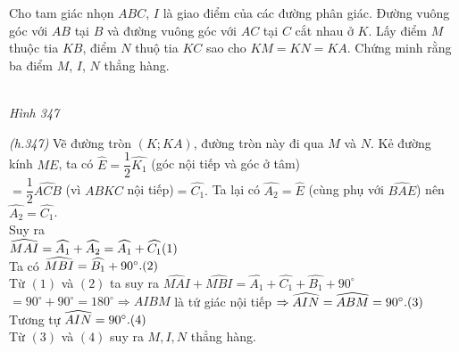 \begin{bt} %
 Cho tam giác nhọn $ABC$, $I$ là giao điểm của các đường phân giác. Đường vuông góc với $AB$ tại $B$ và đường vuông góc với $AC$ tại $C$ cắt nhau ở $K$. Lấy điểm $M$ thuộc tia $KB$, điểm $N$ thuộ tia $KC$ sao cho $KM=KN=KA$. Chứng minh rằng ba điểm $M$, $I$, $N$ thẳng hàng.
 \loigiai
  { 
  \begin{center}
   \\ \textit{Hình 347}
  \end{center}
		\textit{(h.347)} Vẽ đường tròn $(K;KA)$, đường tròn này đi qua $M$ và $N$. Kẻ đường kính $ME$, ta có $\widehat{E}=\dfrac{1}{2}\widehat{K_1}$ (góc nội tiếp và góc ở tâm)
		\\
		$=\dfrac{1}{2}\widehat{ACB}$ (vì $ABKC$ nội tiếp)$=\widehat{C_1}.$
		Ta lại có $\widehat{A_2}=\widehat{E}$ (cùng phụ với $\widehat{BAE}$) nên $\widehat{A_2}=\widehat{C_1}$.\\
		Suy ra \\
		$\widehat{MAI}=\widehat{A_1}+\widehat{A_2}=\widehat{A_1}+\widehat{C_1}\hfill (1)$\\
	Ta có $\widehat{MBI}=\widehat{B_1}+90^{\circ}.\hfill (2)$\\
Từ $(1)$ và $(2)$ ta suy ra $\widehat{MAI}+\widehat{MBI}=\widehat{A_1}+\widehat{C_1}+\widehat{B_1}+90^{\circ}$\\
$=90^{\circ}+90^{\circ}=180^{\circ}\Rightarrow AIBM$ là tứ giác nội tiếp $\Rightarrow \widehat{AIN}=\widehat{ABM} =90^{\circ}.\hfill (3)$\\
Tương tự $\widehat{AIN}=90^{\circ}.\hfill (4)$\\
Từ $(3)$ và $(4)$ suy ra $M, I, N$ thẳng hàng.
	}
\end{bt}

